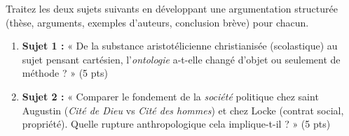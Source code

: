\documentclass[11pt]{article}
\begin{document}
\begin{exercice}
Traitez les deux sujets suivants en développant une argumentation structurée (thèse, arguments, exemples d'auteurs, conclusion brève) pour chacun.

\begin{enumerate}
    \item \textbf{Sujet 1 :} « De la substance aristotélicienne christianisée (scolastique) au sujet pensant cartésien, l'\textit{ontologie} a-t-elle changé d'objet ou seulement de méthode ? » (5 pts)
    \item \textbf{Sujet 2 :} « Comparer le fondement de la \textit{société} politique chez saint Augustin (\textit{Cité de Dieu} vs \textit{Cité des hommes}) et chez Locke (contrat social, propriété). Quelle rupture anthropologique cela implique-t-il ? » (5 pts)
\end{enumerate}
\end{exercice}
\end{document}
